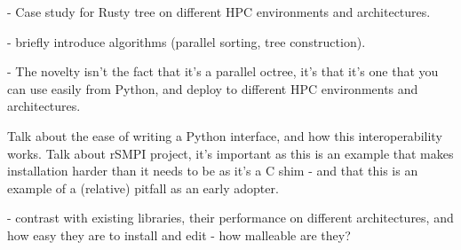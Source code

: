 - Case study for Rusty tree on different HPC environments and architectures. 

- briefly introduce algorithms (parallel sorting, tree construction).

- The novelty isn't the fact that it's a parallel octree, it's that it's one that you can use easily from Python, and deploy to different HPC environments and architectures.

Talk about the ease of writing a Python interface, and how this interoperability works. Talk about rSMPI project, it's important as this is an example that makes installation harder than it needs to be as it's a C shim - and that this is an example of a (relative) pitfall as an early adopter.

- contrast with existing libraries, their performance on different architectures, and how easy they are to install and edit - how malleable are they?

